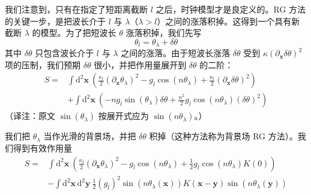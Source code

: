 我们注意到，只有在指定了短距离截断 $l$ 之后，时钟模型才是良定义的。RG 方法的关键一步，是把波长介于 $l$ 与 $\lambda$（$\lambda > l$）之间的涨落积掉。这得到一个具有新截断 $\lambda$ 的模型。为了把短波长 $\theta$ 涨落积掉，我们先写
\begin{equation*}
\theta_{l} = \theta_{\lambda} + \delta\theta
\end{equation*}
其中 $\delta\theta$ 只包含波长介于 $l$ 与 $\lambda$ 之间的涨落。由于短波长涨落 $\delta\theta$ 受到 $\kappa(\partial_{\pmb{x}}\delta\theta)^{2}$ 项的压制，我们预期 $\delta\theta$ 很小，并把作用量展开到 $\delta\theta$ 的二阶：
\begin{equation*}
\begin{aligned}
S = {} & \int \mathrm{d}^{2}\pmb{x}\ \left( \frac{\kappa_{l}}{2}(\partial_{\pmb{x}}\theta_{\lambda})^{2} - g_{l}\cos(n\theta_{\lambda}) + \frac{\kappa_{l}}{2}(\partial_{\pmb{x}}\delta\theta)^{2} \right) \\
& + \int \mathrm{d}^{2}\pmb{x}\ \left( -ng_{l}\sin(\theta_{\lambda})\delta\theta + \frac{n^{2}}{2}g_{l}\cos(n\theta_{\lambda})(\delta\theta)^{2} \right)
\end{aligned}
\end{equation*}
（译注：原文 $\sin(\theta_{\lambda})$ 按展开式应为 $\sin(n\theta_{\lambda})$。）

我们把 $\theta_{\lambda}$ 当作光滑的背景场，并把 $\delta\theta$ 积掉（这种方法称为背景场 RG 方法）。我们得到有效作用量
\begin{equation*}
\begin{aligned}
S = {} & \int \mathrm{d}^{2}\pmb{x}\ \left( \frac{\kappa_{l}}{2}(\partial_{\pmb{x}}\theta_{\lambda})^{2} - g_{l}\cos(n\theta_{\lambda}) + \frac{1}{2}g_{l}\cos(n\theta_{\lambda})K(0) \right) \\
& - \int \mathrm{d}^{2}\pmb{x}\,\mathrm{d}^{2}\pmb{y}\ \frac{1}{2}(g_{l})^{2}\sin(n\theta_{\lambda}(\pmb{x}))K(\pmb{x}-\pmb{y})\sin(n\theta_{\lambda}(\pmb{y}))
\end{aligned}
\end{equation*}

